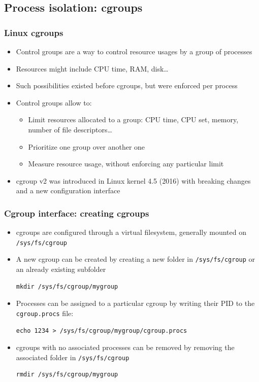 \subsection{Process isolation: cgroups}

\begin{frame}
	\frametitle{Linux cgroups}
	\begin{itemize}
		\item Control groups are a way to control resource usages by a group of processes
		\item Resources might include CPU time, RAM, disk\ldots
		\item Such possibilities existed before cgroups, but were enforced per
			process
		\item Control groups allow to:
			\begin{itemize}
				\item Limit resources allocated to a group: CPU time, CPU set, memory,
					number of file descriptors\ldots
				\item Prioritize one group over another one
				\item Measure resource usage, without enforcing any particular limit
			\end{itemize}
		\item cgroup v2 was introduced in Linux kernel 4.5 (2016) with breaking
			changes and a new configuration interface
	\end{itemize}
\end{frame}

\begin{frame}[fragile]
	\frametitle{Cgroup interface: creating cgroups}
	\begin{itemize}
		\item cgroups are configured through a virtual filesystem, generally mounted
			on \texttt{/sys/fs/cgroup}
		\item A new cgroup can be created by creating a new folder in
			\texttt{/sys/fs/cgroup} or an already existing subfolder
			\begin{block}{}
				{\tiny
				\begin{verbatim}
mkdir /sys/fs/cgroup/mygroup
\end{verbatim}
}
			\end{block}
		\item Processes can be assigned to a particular cgroup by writing their PID
			to the \texttt{cgroup.procs} file:
			\begin{block}{}
				{\tiny
				\begin{verbatim}
echo 1234 > /sys/fs/cgroup/mygroup/cgroup.procs
\end{verbatim}
}
			\end{block}
		\item cgroups with no associated processes can be removed by removing the
			associated folder in \texttt{/sys/fs/cgroup}
			\begin{block}{}
				{\tiny
				\begin{verbatim}
rmdir /sys/fs/cgroup/mygroup
\end{verbatim}
}
			\end{block}
	\end{itemize}
\end{frame}

